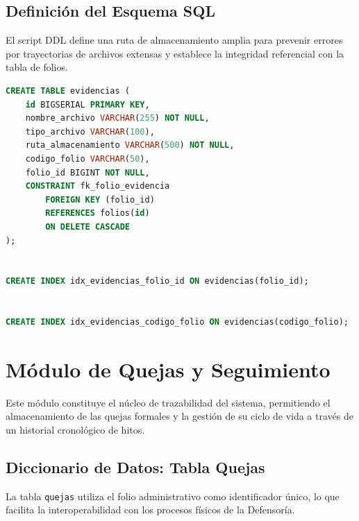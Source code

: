 \subsection{Definici\'on del Esquema SQL}
El script DDL define una ruta de almacenamiento amplia para prevenir errores por trayectorias de archivos extensas y establece la integridad referencial con la tabla de folios.

\begin{lstlisting}[language=SQL, caption={Script de creaci\'on para la tabla de evidencias digitales.}, label={lst:sql_evidencias}]
CREATE TABLE evidencias (
    id BIGSERIAL PRIMARY KEY,
    nombre_archivo VARCHAR(255) NOT NULL,
    tipo_archivo VARCHAR(100),
    ruta_almacenamiento VARCHAR(500) NOT NULL,
    codigo_folio VARCHAR(50),
    folio_id BIGINT NOT NULL,
    CONSTRAINT fk_folio_evidencia 
        FOREIGN KEY (folio_id) 
        REFERENCES folios(id) 
        ON DELETE CASCADE
);


CREATE INDEX idx_evidencias_folio_id ON evidencias(folio_id);


CREATE INDEX idx_evidencias_codigo_folio ON evidencias(codigo_folio);
\end{lstlisting}


\section{M\'odulo de Quejas y Seguimiento}
Este m\'odulo constituye el n\'ucleo de trazabilidad del sistema, permitiendo el almacenamiento de las quejas formales y la gesti\'on de su ciclo de vida a trav\'es de un historial cronol\'ogico de hitos.

\subsection{Diccionario de Datos: Tabla Quejas}
La tabla \texttt{quejas} utiliza el folio administrativo como identificador \'unico, lo que facilita la interoperabilidad con los procesos f\'isicos de la Defensor\'ia.

